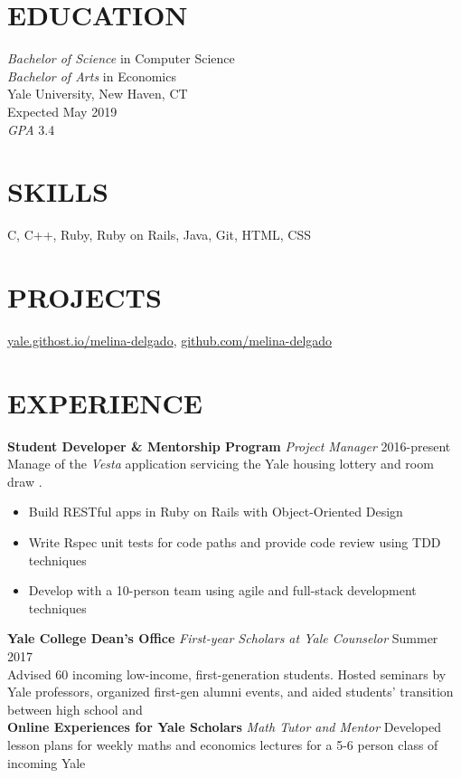 \documentclass[margin, centered]{res}
\begin{document}
\address{130 Prospect St | New Haven, CT 06511 | (954) 682-8999 | melina.delgado@yale.edu}

\begin{resume}
  \section{EDUCATION}
  \textit{Bachelor of Science} in Computer Science \\
  \textit{Bachelor of Arts} in Economics \\
  Yale University, New Haven, CT \\
  Expected May 2019 \\
  \textit{GPA} 3.4

  \section{SKILLS}
  C, C++, Ruby, Ruby on Rails, Java, Git, HTML, CSS
  
  \section{PROJECTS}
  \href{http://yale.githost.io/melina-delgado}{yale.githost.io/melina-delgado},  
  \href{http://github.com/melina-delgado}{github.com/melina-delgado}

  \section{EXPERIENCE}
  \textbf{Student Developer \&  Mentorship Program} \textit{Project Manager} \hfill 2016-present \\
  Manage of the \textit{Vesta} application servicing the Yale housing lottery and room draw . 
  \begin{itemize}
    \item Build RESTful apps in Ruby on Rails with Object-Oriented Design
    \item Write Rspec unit tests for code paths and provide code review using TDD techniques
    \item Develop with a 10-person team using agile and full-stack development techniques
  \end{itemize}
  \textbf{Yale College Dean's Office} \textit{First-year Scholars at Yale Counselor} \hfill Summer 2017 \\
  Advised 60 incoming low-income, first-generation students. Hosted seminars by Yale professors, organized first-gen alumni events, and aided students' transition between high school and  \\
  \textbf{Online Experiences for Yale Scholars} \textit{Math Tutor and Mentor}
  Developed lesson plans for weekly maths and economics lectures for a 5-6 person class of incoming Yale 


\end{resume}
\end{document}
